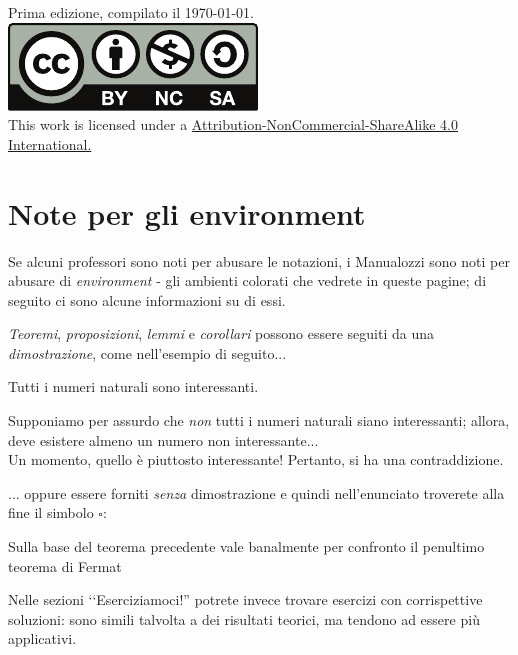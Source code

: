 \vfill
\begin{center}
	Prima edizione, compilato il \today.\\
			\includegraphics[trim=0cm 0cm 0cm 0cm,clip,scale=0.5]{images/Cc-by-nc-sa_icon.pdf}\\
	{\footnotesize This work is licensed under a \href{https://creativecommons.org/licenses/by-sa/4.0/}{Attribution-NonCommercial-ShareAlike 4.0 International.}}
\end{center}
\newpage
\section*{Note per gli environment}
Se alcuni professori sono noti per abusare le notazioni, i Manualozzi sono noti per abusare di \textit{environment} - gli ambienti colorati che vedrete in queste pagine; di seguito ci sono alcune informazioni su di essi.

\noindent\textit{Teoremi}, \textit{proposizioni}, \textit{lemmi} e \textit{corollari} possono essere seguiti da una \textit{dimostrazione}, come nell'esempio di seguito...
\begin{theoremanote}
	Tutti i numeri naturali sono interessanti.
\end{theoremanote}
\begin{demonstration}
	Supponiamo per assurdo che \textit{non} tutti i numeri naturali siano interessanti; allora, deve esistere almeno un numero non interessante...\\
	Un momento, quello è piuttosto interessante! Pertanto, si ha una contraddizione.
\end{demonstration}
... oppure essere forniti \textit{senza} dimostrazione e quindi nell'enunciato troverete alla fine il simbolo $\square$:
\begin{corollarynote}
	Sulla base del teorema precedente vale banalmente per confronto il penultimo teorema di Fermat
\end{corollarynote}
Nelle sezioni ‘‘Eserciziamoci!'' potrete invece trovare esercizi con corrispettive soluzioni: sono simili talvolta a dei risultati teorici, ma tendono ad essere più applicativi.

